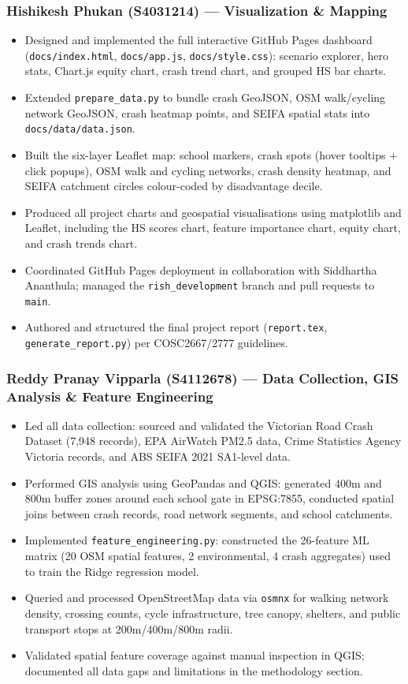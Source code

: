 \documentclass[11pt,a4paper]{article}
\begin{document}
\subsubsection*{Hishikesh Phukan (S4031214) — Visualization \& Mapping}
\begin{itemize}
  \item Designed and implemented the full interactive GitHub Pages dashboard (\texttt{docs/index.html}, \texttt{docs/app.js}, \texttt{docs/style.css}): scenario explorer, hero stats, Chart.js equity chart, crash trend chart, and grouped HS bar charts.
  \item Extended \texttt{prepare\_data.py} to bundle crash GeoJSON, OSM walk/cycling network GeoJSON, crash heatmap points, and SEIFA spatial stats into \texttt{docs/data/data.json}.
  \item Built the six-layer Leaflet map: school markers, crash spots (hover tooltips + click popups), OSM walk and cycling networks, crash density heatmap, and SEIFA catchment circles colour-coded by disadvantage decile.
  \item Produced all project charts and geospatial visualisations using matplotlib and Leaflet, including the HS scores chart, feature importance chart, equity chart, and crash trends chart.
  \item Coordinated GitHub Pages deployment in collaboration with Siddhartha Ananthula; managed the \texttt{rish\_development} branch and pull requests to \texttt{main}.
  \item Authored and structured the final project report (\texttt{report.tex}, \texttt{generate\_report.py}) per COSC2667/2777 guidelines.
\end{itemize}

\subsubsection*{Reddy Pranay Vipparla (S4112678) — Data Collection, GIS Analysis \& Feature Engineering}
\begin{itemize}
  \item Led all data collection: sourced and validated the Victorian Road Crash Dataset (7,948 records), EPA AirWatch PM2.5 data, Crime Statistics Agency Victoria records, and ABS SEIFA 2021 SA1-level data.
  \item Performed GIS analysis using GeoPandas and QGIS: generated 400m and 800m buffer zones around each school gate in EPSG:7855, conducted spatial joins between crash records, road network segments, and school catchments.
  \item Implemented \texttt{feature\_engineering.py}: constructed the 26-feature ML matrix (20 OSM spatial features, 2 environmental, 4 crash aggregates) used to train the Ridge regression model.
  \item Queried and processed OpenStreetMap data via \texttt{osmnx} for walking network density, crossing counts, cycle infrastructure, tree canopy, shelters, and public transport stops at 200m/400m/800m radii.
  \item Validated spatial feature coverage against manual inspection in QGIS; documented all data gaps and limitations in the methodology section.
\end{itemize}
\end{document}
